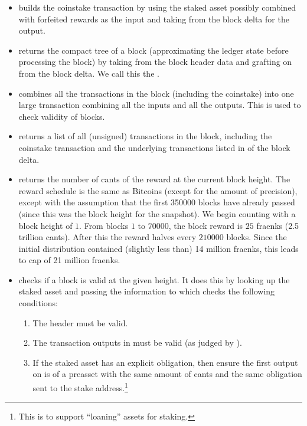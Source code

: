 \begin{itemize}
\item {} builds the coinstake transaction by
using the staked asset possibly combined with forfeited rewards as the input
and taking {} from the block delta for the output.
\item {} returns the compact tree of a block (approximating the ledger state before
processing the block) by taking {} from the block header data
and grafting on {} from the block delta.
We call this the {}.
\item {} combines all the transactions in the block (including the coinstake) into one large transaction combining all the inputs and all the outputs.
This is used to check validity of blocks.
\item {} returns a list of all (unsigned) transactions in the block,
including the coinstake transaction and the underlying transactions listed in {} of the block delta.
\item {} returns the number of cants of the reward at the current block height.
The reward schedule is the same as Bitcoins (except for the amount of precision), except with the assumption that the first 350000 blocks have already passed (since this was the block height for the snapshot).
We begin counting with a block height of $1$. From blocks $1$ to $70000$,
the block reward is $25$ fraenks (2.5 trillion cants).
After this the reward halves every $210000$ blocks.
Since the initial distribution contained (slightly less than) 14 million fraenks, this leads to cap of 21 million fraenks.
\item {} checks if a block is valid at the given height.
It does this by looking up the staked asset and passing the information to {}
which checks the following conditions:
\begin{enumerate}
\item The header must be valid.
\item The transaction outputs in {} must be valid (as judged by {}).
\item If the staked asset has an explicit obligation, then ensure the first output on {}
is of a preasset with the same amount of cants and the same obligation sent to the stake address.\footnote{This is to support ``loaning'' assets for staking.}

\end{enumerate}
\end{itemize}
